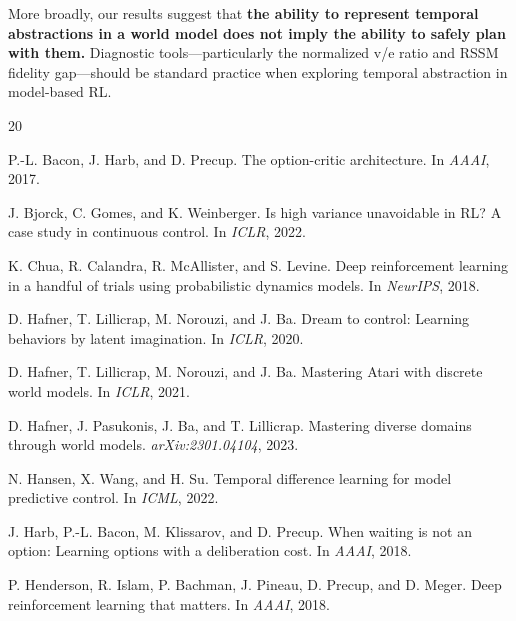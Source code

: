\documentclass[letterpaper]{article}
\begin{document}
More broadly, our results suggest that \textbf{the ability to represent temporal abstractions in a world model does not imply the ability to safely plan with them.}
Diagnostic tools---particularly the normalized v/e ratio and RSSM fidelity gap---should be standard practice when exploring temporal abstraction in model-based RL.


\begin{thebibliography}{20}

P.-L. Bacon, J. Harb, and D. Precup.
\newblock The option-critic architecture.
\newblock In \emph{AAAI}, 2017.

J. Bjorck, C. Gomes, and K. Weinberger.
\newblock Is high variance unavoidable in RL? A case study in continuous control.
\newblock In \emph{ICLR}, 2022.

K. Chua, R. Calandra, R. McAllister, and S. Levine.
\newblock Deep reinforcement learning in a handful of trials using probabilistic dynamics models.
\newblock In \emph{NeurIPS}, 2018.

D. Hafner, T. Lillicrap, M. Norouzi, and J. Ba.
\newblock Dream to control: Learning behaviors by latent imagination.
\newblock In \emph{ICLR}, 2020.

D. Hafner, T. Lillicrap, M. Norouzi, and J. Ba.
\newblock Mastering Atari with discrete world models.
\newblock In \emph{ICLR}, 2021.

D. Hafner, J. Pasukonis, J. Ba, and T. Lillicrap.
\newblock Mastering diverse domains through world models.
\newblock \emph{arXiv:2301.04104}, 2023.

N. Hansen, X. Wang, and H. Su.
\newblock Temporal difference learning for model predictive control.
\newblock In \emph{ICML}, 2022.

J. Harb, P.-L. Bacon, M. Klissarov, and D. Precup.
\newblock When waiting is not an option: Learning options with a deliberation cost.
\newblock In \emph{AAAI}, 2018.

P. Henderson, R. Islam, P. Bachman, J. Pineau, D. Precup, and D. Meger.
\newblock Deep reinforcement learning that matters.
\newblock In \emph{AAAI}, 2018.


\end{thebibliography}
\end{document}
